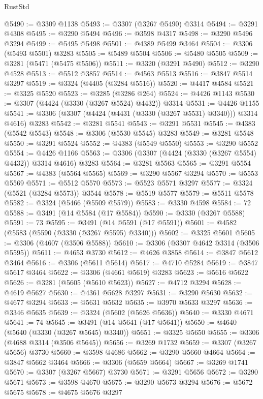 \begin{lexlean}{RustStd}
\begin{coremodule}
@5490 := @3309 @1138
@5493 := @3307 (@3267 @5490) @3314
@5494 := @3291 @4308
@5495 := @3290 @5494
@5496 := @3598 @4317
@5498 := @3290 @5496 @3294
@5499 := @5495 @5498
@5501 := @4389 @5499 @3464
@5504 := @3306 (@5493 @5501) @3283
@5505 := @5489 @5504
@5506 := @5480 @5505
@5509 := @3281 (@5471 (@5475 @5506))
@5511 := @3320 (@3291 @5490)
@5512 := @3290 @4528
@5513 := @5512 @3857
@5514 := @4563 @5513
@5516 := @3847 @5514 @3297
@5519 := @3324 (@4405 (@3284 @5516))
@5520 := @4417 @4584
@5521 := @3325 @5520
@5523 := @3285 (@3286 @264)
@5524 := @4426 @1143
@5530 := @3307 (@4424 (@3330 (@3267 @5524) @4432)) @3314
@5531 := @4426 @1155
@5541 := @3306 (@3307 (@4424 (@4431 (@3330 (@3267 @5531) @3340))) @3314 @4616) @3283
@5542 := @3281 @5541
@5543 := @3291 @5531
@5545 := @4383 (@5542 @5543)
@5548 := @3306 (@5530 @5545) @3283
@5549 := @3281 @5548
@5550 := @3291 @5524
@5552 := @4383 (@5549 @5550)
@5553 := @3290 @5552
@5554 := @4426 @1166
@5563 := @3306 (@3307 (@4424 (@3330 (@3267 @5554) @4432)) @3314 @4616) @3283
@5564 := @3281 @5563
@5565 := @3291 @5554
@5567 := @4383 (@5564 @5565)
@5569 := @3290 @5567 @3294
@5570 := @5553 @5569
@5571 := @5512 @5570
@5573 := @5523 @5571 @3297
@5577 := @3324 (@5521 (@3284 @5573)) @3544
@5578 := @5519 @5577
@5579 := @5511 @5578
@5582 := @3324 (@5466 (@5509 @5579))
@5583 := @3330 @4598
@5584 := 72
@5588 := @3491 (@14 @5584 (@17 @5584))
@5590 := @3330 (@3267 @5588)
@5591 := 73
@5595 := @3491 (@14 @5591 (@17 @5591))
@5601 := @4582 (@5583 (@5590 (@3330 (@3267 @5595) @3340)))
@5602 := @3325 @5601
@5605 := @3306 (@4607 (@3506 @5588))
@5610 := @3306 (@3307 @4642 @3314 (@3506 @5595))
@5611 := @4653 @3730
@5612 := @4626 @3858
@5614 := @3847 @5612 @3464
@5616 := @3306 (@5611 @5614)
@5617 := @4710 @5284
@5619 := @3847 @5617 @3464
@5622 := @3306 (@4661 @5619) @3283
@5623 := @5616 @5622
@5626 := @3281 (@5605 (@5610 @5623))
@5627 := @4712 @3294
@5628 := @4619 @5627
@5630 := @4361 @5628 @3297
@5631 := @3290 @5630
@5632 := @4677 @3294
@5633 := @5631 @5632
@5635 := @3970 @5633 @3297
@5636 := @3346 @5635
@5639 := @3324 (@5602 (@5626 @5636))
@5640 := @3330 @4671
@5641 := 74
@5645 := @3491 (@14 @5641 (@17 @5641))
@5650 := @4640 (@5640 (@3330 (@3267 @5645) @3340))
@5651 := @3325 @5650
@5655 := @3306 (@4688 @3314 (@3506 @5645))
@5656 := @3269 @1732
@5659 := @3307 (@3267 @5656) @3730
@5660 := @3598 @4686
@5662 := @3290 @5660 @4664
@5664 := @3847 @5662 @3464
@5666 := @3306 (@5659 @5664)
@5667 := @3269 @1741
@5670 := @3307 (@3267 @5667) @3730
@5671 := @3291 @5656
@5672 := @3290 @5671
@5673 := @3598 @4670
@5675 := @3290 @5673 @3294
@5676 := @5672 @5675
@5678 := @4675 @5676 @3297

\end{coremodule}
\end{lexlean}
